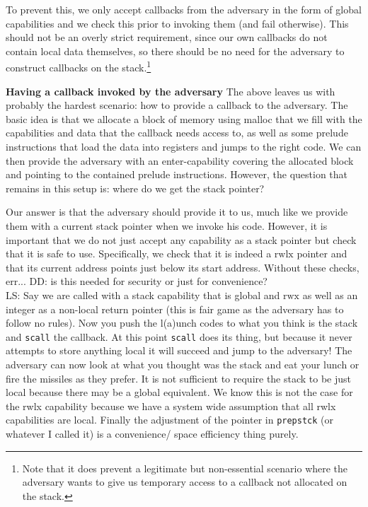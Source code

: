 \documentclass[compsoc,conference,letterpaper,fleqn]{IEEEtran}
\newcommand\lau[1]{{\color{purple} \sf \footnotesize {LS: #1}}\\}
\newcommand\dominique[1]{{\color{purple} \sf \footnotesize {DD: #1}}\\}
\newcommand{\plainperm}[1]{\mathrm{#1}}
\newcommand{\rwx}{\plainperm{rwx}}
\newcommand{\rwlx}{\plainperm{rwlx}}
\begin{document}
To prevent this, we only accept callbacks from the adversary in the form of
global capabilities and we check this prior to invoking them (and fail
otherwise). This should not be an overly strict requirement, since our own
callbacks do not contain local data themselves, so there should be no need for
the adversary to construct callbacks on the stack.\footnote{Note that it does
  prevent a legitimate but non-essential scenario where the adversary wants to
  give us temporary access to a callback not allocated on the stack.}

\textbf{Having a callback invoked by the adversary}
The above leaves us with probably the hardest scenario: how to provide a
callback to the adversary. The basic idea is that we allocate a block of memory
using malloc that we fill with the capabilities and data that the callback needs
access to, as well as some prelude instructions that load the data into
registers and jumps to the right code. We can then provide the adversary with an
enter-capability covering the allocated block and pointing to the contained
prelude instructions. However, the question that remains in this setup is: where
do we get the stack pointer?

Our answer is that the adversary should provide it to us, much like we provide
them with a current stack pointer when we invoke his code.  However, it is
important that we do not just accept any capability as a stack pointer but check
that it is safe to use.  Specifically, we check that it is indeed a $\rwlx$
pointer and that its current address points just below its start address.
Without these checks, err...
\dominique{is this needed for security or just for convenience?}
\lau{Say we are called with a stack capability that is global and $\rwx$ as well as an integer as a non-local return pointer (this is fair game as the adversary has to follow no rules). Now you push the l(a)unch codes to what you think is the stack and \texttt{scall} the callback. At this point \texttt{scall} does its thing, but because it never attempts to store anything local it will succeed and jump to the adversary! The adversary can now look at what you thought was the stack and eat your lunch or fire the missiles as they prefer. It is not sufficient to require the stack to be just local because there may be a global equivalent. We know this is not the case for the rwlx capability because we have a system wide assumption that all rwlx capabilities are local.
Finally the adjustment of the pointer in \texttt{prepstck} (or whatever I called it) is a convenience/ space efficiency thing purely.}
\end{document}
